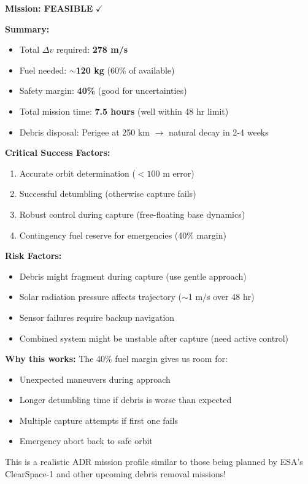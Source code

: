 \documentclass[11pt,a4paper]{article}
\begin{document}
\begin{tcolorbox}[colback=blue!5!white,colframe=blue!60!black,title=Final Answer - Mission Feasibility]
\textbf{Mission: FEASIBLE} $\checkmark$

\textbf{Summary:}
\begin{itemize}[nosep]
    \item Total $\Delta v$ required: \textbf{278 m/s}
    \item Fuel needed: \textbf{$\sim$120 kg} (60\% of available)
    \item Safety margin: \textbf{40\%} (good for uncertainties)
    \item Total mission time: \textbf{7.5 hours} (well within 48 hr limit)
    \item Debris disposal: Perigee at 250 km $\rightarrow$ natural decay in 2-4 weeks
\end{itemize}

\textbf{Critical Success Factors:}
\begin{enumerate}[nosep]
    \item Accurate orbit determination ($< 100$ m error)
    \item Successful detumbling (otherwise capture fails)
    \item Robust control during capture (free-floating base dynamics)
    \item Contingency fuel reserve for emergencies (40\% margin)
\end{enumerate}

\textbf{Risk Factors:}
\begin{itemize}[nosep]
    \item Debris might fragment during capture (use gentle approach)
    \item Solar radiation pressure affects trajectory ($\sim$1 m/s over 48 hr)
    \item Sensor failures require backup navigation
    \item Combined system might be unstable after capture (need active control)
\end{itemize}

\textbf{Why this works:} The 40\% fuel margin gives us room for:
\begin{itemize}[nosep]
    \item Unexpected maneuvers during approach
    \item Longer detumbling time if debris is worse than expected
    \item Multiple capture attempts if first one fails
    \item Emergency abort back to safe orbit
\end{itemize}

This is a realistic ADR mission profile similar to those being planned by ESA's ClearSpace-1 and other upcoming debris removal missions!
\end{tcolorbox}
\end{document}
